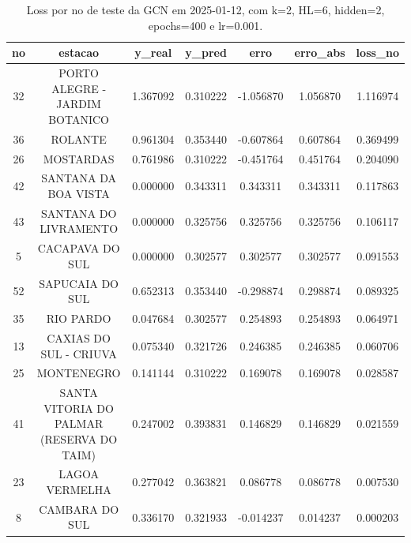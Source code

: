 \begin{table}[h]
\centering
\caption{Loss por no de teste da GCN em 2025-01-12, com k=2, HL=6, hidden=2, epochs=400 e lr=0.001.}
\label{tab:gcn_loss_k2_hl6_h2_e400_d20250112}
\begin{tabular}{ccccccc}
\toprule
no & estacao & y\_real & y\_pred & erro & erro\_abs & loss\_no \\
\midrule
32 & PORTO ALEGRE - JARDIM BOTANICO & 1.367092 & 0.310222 & -1.056870 & 1.056870 & 1.116974 \\
36 & ROLANTE & 0.961304 & 0.353440 & -0.607864 & 0.607864 & 0.369499 \\
26 & MOSTARDAS & 0.761986 & 0.310222 & -0.451764 & 0.451764 & 0.204090 \\
42 & SANTANA DA BOA VISTA & 0.000000 & 0.343311 & 0.343311 & 0.343311 & 0.117863 \\
43 & SANTANA DO LIVRAMENTO & 0.000000 & 0.325756 & 0.325756 & 0.325756 & 0.106117 \\
5 & CACAPAVA DO SUL & 0.000000 & 0.302577 & 0.302577 & 0.302577 & 0.091553 \\
52 & SAPUCAIA DO SUL & 0.652313 & 0.353440 & -0.298874 & 0.298874 & 0.089325 \\
35 & RIO PARDO & 0.047684 & 0.302577 & 0.254893 & 0.254893 & 0.064971 \\
13 & CAXIAS DO SUL - CRIUVA & 0.075340 & 0.321726 & 0.246385 & 0.246385 & 0.060706 \\
25 & MONTENEGRO & 0.141144 & 0.310222 & 0.169078 & 0.169078 & 0.028587 \\
41 & SANTA VITORIA DO PALMAR (RESERVA DO TAIM) & 0.247002 & 0.393831 & 0.146829 & 0.146829 & 0.021559 \\
23 & LAGOA VERMELHA & 0.277042 & 0.363821 & 0.086778 & 0.086778 & 0.007530 \\
8 & CAMBARA DO SUL & 0.336170 & 0.321933 & -0.014237 & 0.014237 & 0.000203 \\
\bottomrule
\end{tabular}
\end{table}
